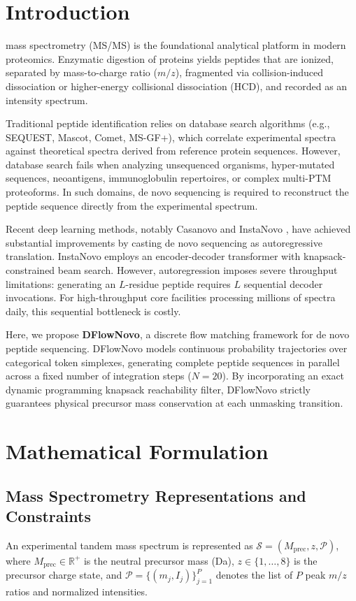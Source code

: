 \documentclass[10pt,journal,compsoc]{IEEEtran}
\begin{document}
\section{Introduction}
 mass spectrometry (MS/MS) is the foundational analytical platform in modern proteomics. Enzymatic digestion of proteins yields peptides that are ionized, separated by mass-to-charge ratio ($m/z$), fragmented via collision-induced dissociation or higher-energy collisional dissociation (HCD), and recorded as an intensity spectrum.

Traditional peptide identification relies on database search algorithms (e.g., SEQUEST, Mascot, Comet, MS-GF+), which correlate experimental spectra against theoretical spectra derived from reference protein sequences. However, database search fails when analyzing unsequenced organisms, hyper-mutated sequences, neoantigens, immunoglobulin repertoires, or complex multi-PTM proteoforms. In such domains, de novo sequencing is required to reconstruct the peptide sequence directly from the experimental spectrum.

Recent deep learning methods, notably Casanovo \cite{casanovo} and InstaNovo \cite{instanovo}, have achieved substantial improvements by casting de novo sequencing as autoregressive translation. InstaNovo employs an encoder-decoder transformer with knapsack-constrained beam search. However, autoregression imposes severe throughput limitations: generating an $L$-residue peptide requires $L$ sequential decoder invocations. For high-throughput core facilities processing millions of spectra daily, this sequential bottleneck is costly.

Here, we propose \textbf{DFlowNovo}, a discrete flow matching framework for de novo peptide sequencing. DFlowNovo models continuous probability trajectories over categorical token simplexes, generating complete peptide sequences in parallel across a fixed number of integration steps ($N = 20$). By incorporating an exact dynamic programming knapsack reachability filter, DFlowNovo strictly guarantees physical precursor mass conservation at each unmasking transition.

\section{Mathematical Formulation}

\subsection{Mass Spectrometry Representations and Constraints}
An experimental tandem mass spectrum is represented as $\mathcal{S} = (M_{\text{prec}}, z, \mathcal{P})$, where $M_{\text{prec}} \in \mathbb{R}^+$ is the neutral precursor mass (Da), $z \in \{1,\dots,8\}$ is the precursor charge state, and $\mathcal{P} = \{(m_j, I_j)\}_{j=1}^P$ denotes the list of $P$ peak $m/z$ ratios and normalized intensities.
\end{document}
